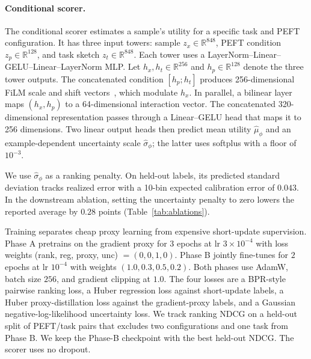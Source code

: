 \paragraph{Conditional scorer.}
The conditional scorer estimates a sample's utility for a specific task and
PEFT configuration. It has three input towers: sample
$z_x \in \mathbb{R}^{848}$, PEFT condition $z_p \in \mathbb{R}^{128}$, and task
sketch $z_t \in \mathbb{R}^{848}$.
Each tower uses a LayerNorm--Linear--GELU--Linear--LayerNorm MLP. Let
$h_x,h_t\in\mathbb{R}^{256}$ and $h_p\in\mathbb{R}^{128}$ denote the three tower
outputs. The concatenated condition $[h_p;h_t]$ produces 256-dimensional FiLM
scale and shift vectors~\cite{perez2018film}, which modulate $h_x$. In parallel,
a bilinear layer maps $(h_x,h_p)$ to a 64-dimensional interaction vector. The
concatenated 320-dimensional representation passes through a
Linear--GELU head that maps it to 256 dimensions. Two linear output heads then
predict mean utility $\widehat{\mu}_{\phi}$ and an example-dependent uncertainty
scale $\widehat{\sigma}_{\phi}$; the latter uses softplus with a floor of
$10^{-3}$.

We use $\widehat{\sigma}_{\phi}$ as a ranking penalty.
On held-out labels, its predicted standard deviation tracks realized error with
a 10-bin expected calibration error of $0.043$. In the downstream ablation,
setting the uncertainty penalty to zero lowers the reported average by $0.28$
points (Table~\ref{tab:ablations}).

Training separates cheap proxy learning from expensive short-update supervision.
Phase A pretrains on the gradient proxy for $3$ epochs at lr $3\times10^{-4}$
with loss weights (rank, reg, proxy, unc) $=(0,0,1,0)$. Phase B jointly fine-tunes
for $2$ epochs at lr $10^{-4}$ with weights $(1.0, 0.3, 0.5, 0.2)$. Both phases
use AdamW, batch size $256$, and gradient clipping at $1.0$. The four losses are a
BPR-style pairwise ranking loss, a Huber regression loss against short-update
labels, a Huber proxy-distillation loss against the gradient-proxy labels, and a
Gaussian negative-log-likelihood uncertainty loss. We track ranking NDCG on a
held-out split of PEFT/task pairs that excludes two configurations and one task
from Phase B. We keep the Phase-B checkpoint with the best held-out NDCG. The
scorer uses no dropout.

